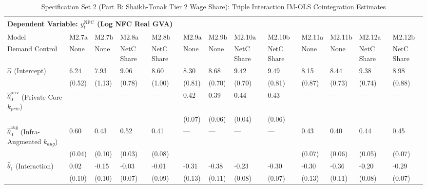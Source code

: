 \begin{table}[H]
\centering
\caption{Specification Set 2 (Part B: Shaikh-Tonak Tier 2 Wage Share): Triple Interaction IM-OLS Cointegration Estimates}
\label{tab:spec_set_2_b}
\scriptsize
\begin{tabular}{p{3.8cm}p{1.5cm}p{1.5cm}p{1.5cm}p{1.5cm}p{1.5cm}p{1.5cm}p{1.5cm}p{1.5cm}p{1.5cm}p{1.5cm}p{1.5cm}p{1.5cm}}
\toprule
\multicolumn{13}{l}{\textbf{Dependent Variable: $y_t^{\text{NFC}}$ (Log NFC Real GVA)}} \\
\midrule
Model & M2.7a & M2.7b & M2.8a & M2.8b & M2.9a & M2.9b & M2.10a & M2.10b & M2.11a & M2.11b & M2.12a & M2.12b  \\
Demand Control & None & None & NetC Share & NetC Share & None & None & NetC Share & NetC Share & None & None & NetC Share & NetC Share  \\
\midrule
$\hat{\alpha}$ (Intercept)  & 6.24 & 7.93 & 9.06 & 8.60 & 8.30 & 8.68 & 9.42 & 9.49 & 8.15 & 8.44 & 9.38 & 8.98  \\
 & {\scriptsize (0.52)} & {\scriptsize (1.13)} & {\scriptsize (0.78)} & {\scriptsize (1.00)} & {\scriptsize (0.81)} & {\scriptsize (0.70)} & {\scriptsize (0.70)} & {\scriptsize (0.81)} & {\scriptsize (0.87)} & {\scriptsize (0.73)} & {\scriptsize (0.74)} & {\scriptsize (0.88)}  \\
$\hat{\theta}_0^{\text{priv}}$ (Private Core $k_{priv}$)  & --- & --- & --- & --- & 0.42 & 0.39 & 0.44 & 0.43 & --- & --- & --- & ---  \\
 &  &  &  &  & {\scriptsize (0.07)} & {\scriptsize (0.06)} & {\scriptsize (0.04)} & {\scriptsize (0.06)} &  &  &  &   \\
$\hat{\theta}_0^{\text{aug}}$ (Infra-Augmented $k_{aug}$)  & 0.60 & 0.43 & 0.52 & 0.41 & --- & --- & --- & --- & 0.43 & 0.40 & 0.44 & 0.45  \\
 & {\scriptsize (0.04)} & {\scriptsize (0.10)} & {\scriptsize (0.03)} & {\scriptsize (0.08)} &  &  &  &  & {\scriptsize (0.07)} & {\scriptsize (0.06)} & {\scriptsize (0.05)} & {\scriptsize (0.07)}  \\
$\hat{\theta}_1$ (Interaction)  & 0.02 & -0.15 & -0.03 & -0.01 & -0.31 & -0.38 & -0.23 & -0.30 & -0.30 & -0.36 & -0.20 & -0.29  \\
 & {\scriptsize (0.10)} & {\scriptsize (0.10)} & {\scriptsize (0.07)} & {\scriptsize (0.09)} & {\scriptsize (0.13)} & {\scriptsize (0.11)} & {\scriptsize (0.08)} & {\scriptsize (0.07)} & {\scriptsize (0.13)} & {\scriptsize (0.11)} & {\scriptsize (0.08)} & {\scriptsize (0.07)}  \\

\end{tabular}
\end{table}
